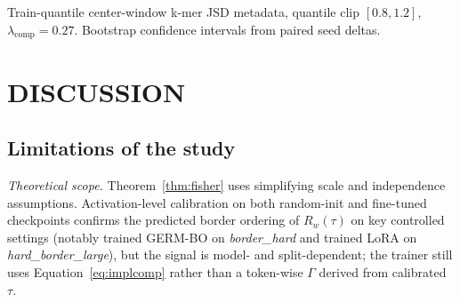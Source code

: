 \documentclass[12pt,letterpaper]{article}
\newcommand{\splitname}[1]{\textit{#1}}
\begin{document}
\begin{table}[!htb]
\centering
\caption{Cross-backbone replication on the strict \splitname{3-mer-balanced} splice split with label-free border metadata (seeds 50--54).}
\label{tab:cross-backbone-splice-label-free}
\small
\setlength{\tabcolsep}{4pt}

Train-quantile center-window k-mer JSD metadata, quantile clip $[0.8,1.2]$, $\lambda_{\mathrm{comp}}=0.27$. Bootstrap confidence intervals from paired seed deltas.
\end{table}



\section*{DISCUSSION}

\subsection*{Limitations of the study}

\noindent\emph{Theoretical scope.} Theorem~\ref{thm:fisher} uses simplifying scale and independence assumptions. Activation-level calibration on both random-init and fine-tuned checkpoints confirms the predicted border ordering of $R_w(\tau)$ on key controlled settings (notably trained GERM-BO on \splitname{border\_hard} and trained LoRA on \splitname{hard\_border\_large}), but the signal is model- and split-dependent; the trainer still uses Equation~\eqref{eq:implcomp} rather than a token-wise $\Gamma$ derived from calibrated $\tau$.
\end{document}
